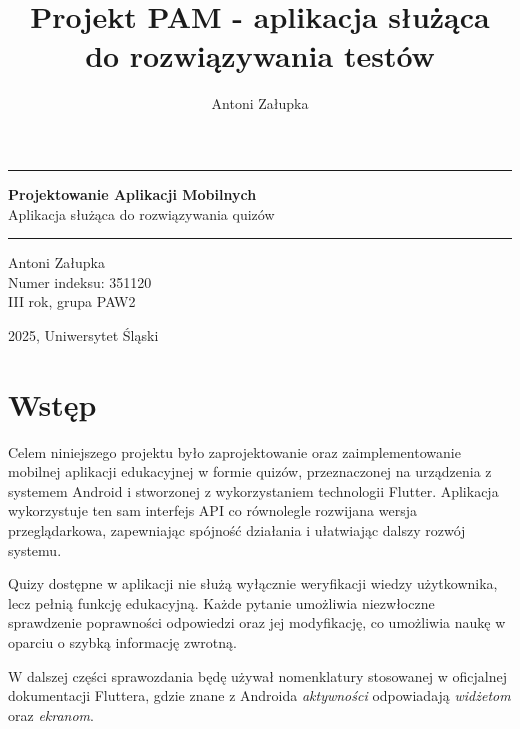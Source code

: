 \documentclass{article}
\title{Projekt PAM - aplikacja służąca do rozwiązywania testów}
\author{Antoni Załupka}
\begin{document}
	\thispagestyle{empty}
	
	
	\vspace{4cm}
	
	\rule{\linewidth}{2mm} 
	
	\begin{center}
		\huge \textbf{Projektowanie Aplikacji Mobilnych} \\
		\huge {Aplikacja służąca do rozwiązywania quizów} \\
	\end{center}
	
	\rule{\linewidth}{0.5mm} 
	
	\vspace{2cm}
	
	\begin{center}
		\Large{Antoni Załupka} \\
		\Large{Numer indeksu: 351120} \\
		\Large{III rok, grupa PAW2} \\
		
	\end{center}
	
	
	\vspace{15cm}
	
	\begin{center}
		\Large{2025, Uniwersytet Śląski}
	\end{center}
	
	\newpage
	
	\tableofcontents
	
	\newpage
	
	\section{Wstęp}
	Celem niniejszego projektu było zaprojektowanie oraz zaimplementowanie mobilnej aplikacji edukacyjnej w formie quizów, przeznaczonej na urządzenia z systemem Android i stworzonej z wykorzystaniem technologii Flutter. Aplikacja wykorzystuje ten sam interfejs API co równolegle rozwijana wersja przeglądarkowa, zapewniając spójność działania i ułatwiając dalszy rozwój systemu.
	
	Quizy dostępne w aplikacji nie służą wyłącznie weryfikacji wiedzy użytkownika, lecz pełnią funkcję edukacyjną. Każde pytanie umożliwia niezwłoczne sprawdzenie poprawności odpowiedzi oraz jej modyfikację, co umożliwia naukę w oparciu o szybką informację zwrotną.
	
	W dalszej części sprawozdania będę używał nomenklatury stosowanej w oficjalnej dokumentacji Fluttera, gdzie znane z Androida \textit{aktywności} odpowiadają \textit{widżetom} oraz \textit{ekranom}.
	
\end{document}
